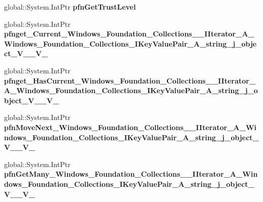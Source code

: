 \begin{DoxyCompactItemize}
\mbox{\label{struct_windows_1_1_foundation_1_1_collections_1_1_i_iterator___a___system___collections___generi1b6291336687b5a660c835303ec8be78_a37e78653118f6eab8c97f676d2a3019e}} 
global\+::\+System.\+Int\+Ptr {\bfseries pfn\+Get\+Trust\+Level}
\item 
\mbox{\label{struct_windows_1_1_foundation_1_1_collections_1_1_i_iterator___a___system___collections___generi1b6291336687b5a660c835303ec8be78_a3ddbd3bfccd819122498a965b26dc9b5}} 
global\+::\+System.\+Int\+Ptr {\bfseries pfnget\+\_\+\+Current\+\_\+\+Windows\+\_\+\+Foundation\+\_\+\+Collections\+\_\+\+\_\+\+I\+Iterator\+\_\+\+A\+\_\+\+Windows\+\_\+\+Foundation\+\_\+\+Collections\+\_\+\+I\+Key\+Value\+Pair\+\_\+\+A\+\_\+string\+\_\+j\+\_\+object\+\_\+\+V\+\_\+\+\_\+\+V\+\_\+}
\item 
\mbox{\label{struct_windows_1_1_foundation_1_1_collections_1_1_i_iterator___a___system___collections___generi1b6291336687b5a660c835303ec8be78_a7c6f036bdc31b67ed8da6e3e9f894107}} 
global\+::\+System.\+Int\+Ptr {\bfseries pfnget\+\_\+\+Has\+Current\+\_\+\+Windows\+\_\+\+Foundation\+\_\+\+Collections\+\_\+\+\_\+\+I\+Iterator\+\_\+\+A\+\_\+\+Windows\+\_\+\+Foundation\+\_\+\+Collections\+\_\+\+I\+Key\+Value\+Pair\+\_\+\+A\+\_\+string\+\_\+j\+\_\+object\+\_\+\+V\+\_\+\+\_\+\+V\+\_\+}
\item 
\mbox{\label{struct_windows_1_1_foundation_1_1_collections_1_1_i_iterator___a___system___collections___generi1b6291336687b5a660c835303ec8be78_ae65aa1e9b9f69c645a54fd1171754101}} 
global\+::\+System.\+Int\+Ptr {\bfseries pfn\+Move\+Next\+\_\+\+Windows\+\_\+\+Foundation\+\_\+\+Collections\+\_\+\+\_\+\+I\+Iterator\+\_\+\+A\+\_\+\+Windows\+\_\+\+Foundation\+\_\+\+Collections\+\_\+\+I\+Key\+Value\+Pair\+\_\+\+A\+\_\+string\+\_\+j\+\_\+object\+\_\+\+V\+\_\+\+\_\+\+V\+\_\+}
\item 
\mbox{\label{struct_windows_1_1_foundation_1_1_collections_1_1_i_iterator___a___system___collections___generi1b6291336687b5a660c835303ec8be78_a73ed3b5d8a703b428537f8989750feaa}} 
global\+::\+System.\+Int\+Ptr {\bfseries pfn\+Get\+Many\+\_\+\+Windows\+\_\+\+Foundation\+\_\+\+Collections\+\_\+\+\_\+\+I\+Iterator\+\_\+\+A\+\_\+\+Windows\+\_\+\+Foundation\+\_\+\+Collections\+\_\+\+I\+Key\+Value\+Pair\+\_\+\+A\+\_\+string\+\_\+j\+\_\+object\+\_\+\+V\+\_\+\+\_\+\+V\+\_\+}
\end{DoxyCompactItemize}
